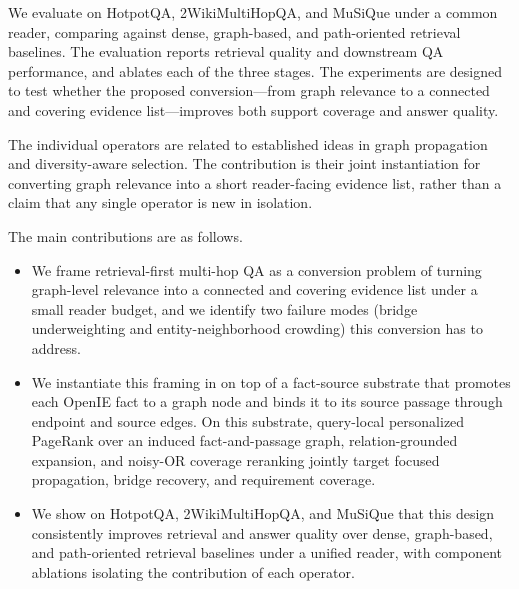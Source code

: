 We evaluate \methodname{} on HotpotQA, 2WikiMultiHopQA, and MuSiQue
under a common reader, comparing against dense, graph-based, and
path-oriented retrieval baselines. The evaluation reports retrieval
quality and downstream QA performance, and ablates each of the three
stages. The experiments are designed to test whether the proposed
conversion---from graph relevance to a connected and covering evidence
list---improves both support coverage and answer quality.

The individual operators are related to established ideas in graph
propagation and diversity-aware selection. The contribution is their
joint instantiation for converting graph relevance into a short
reader-facing evidence list, rather than a claim that any single
operator is new in isolation.

The main contributions are as follows.
\begin{itemize}
    \item We frame retrieval-first multi-hop QA as a conversion
    problem of turning graph-level relevance into a connected and
    covering evidence list under a small reader budget, and we
    identify two failure modes (bridge underweighting and
    entity-neighborhood crowding) this conversion has to address.
    \item We instantiate this framing in \methodname{} on top of a
    fact-source substrate that promotes each OpenIE fact to a graph
    node and binds it to its source passage through endpoint and
    source edges. On this substrate, query-local personalized
    PageRank over an induced fact-and-passage graph,
    relation-grounded expansion, and
    noisy-OR coverage reranking jointly target focused propagation,
    bridge recovery, and requirement coverage.
    \item We show on HotpotQA, 2WikiMultiHopQA, and MuSiQue that
    this design consistently improves retrieval and answer quality
    over dense, graph-based, and path-oriented retrieval baselines
    under a unified reader, with component ablations isolating the
    contribution of each operator.
\end{itemize}

